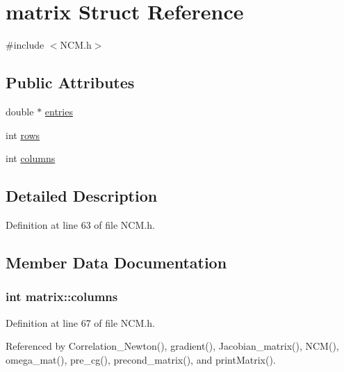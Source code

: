 \hypertarget{structmatrix}{}\section{matrix Struct Reference}
\label{structmatrix}


{\ttfamily \#include $<$N\+C\+M.\+h$>$}

\subsection*{Public Attributes}
\begin{DoxyCompactItemize}
\item 
double $\ast$ \hyperlink{structmatrix_a720057f595a0b775b6d7d8c9badaca78}{entries}
\item 
int \hyperlink{structmatrix_af83737a5597214de0458c5535a787143}{rows}
\item 
int \hyperlink{structmatrix_a69a002417ab248fe46a11badaaede9ef}{columns}
\end{DoxyCompactItemize}


\subsection{Detailed Description}


Definition at line 63 of file N\+C\+M.\+h.



\subsection{Member Data Documentation}
\hypertarget{structmatrix_a69a002417ab248fe46a11badaaede9ef}{}
\subsubsection[{columns}]{\setlength{\rightskip}{0pt plus 5cm}int matrix\+::columns}\label{structmatrix_a69a002417ab248fe46a11badaaede9ef}


Definition at line 67 of file N\+C\+M.\+h.



Referenced by Correlation\+\_\+\+Newton(), gradient(), Jacobian\+\_\+matrix(), N\+C\+M(), omega\+\_\+mat(), pre\+\_\+cg(), precond\+\_\+matrix(), and print\+Matrix().

\hypertarget{structmatrix_a720057f595a0b775b6d7d8c9badaca78}{}
